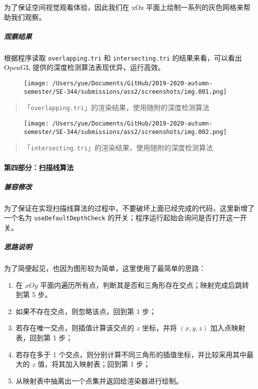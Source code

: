 \documentclass[
]{article}
\begin{document}
为了保证空间视觉观看体验，因此我们在 xOz
平面上绘制一系列的灰色网格来帮助我们观察。

\hypertarget{header-n167}{%
\subparagraph{观察结果}\label{header-n167}}

根据程序读取 \texttt{overlapping.tri} 和 \texttt{intersecting.tri}
的结果来看，可以看出 OpenGL 提供的深度检测算法表现优异，运行高效。

\begin{figure}
\centering
\texttt{[image: /Users/yue/Documents/GitHub/2019-2020-autumn-semester/SE-344/submissions/ass2/screenshots/img.001.png]}
\caption{}
\end{figure}

\begin{quote}
「\texttt{overlapping.tri}」的渲染结果，使用随附的深度检测算法
\end{quote}

\begin{figure}
\centering
\texttt{[image: /Users/yue/Documents/GitHub/2019-2020-autumn-semester/SE-344/submissions/ass2/screenshots/img.002.png]}
\caption{}
\end{figure}

\begin{quote}
「\texttt{intersecting.tri}」的渲染结果，使用随附的深度检测算法
\end{quote}

\hypertarget{header-n187}{%
\paragraph{第四部分：扫描线算法}\label{header-n187}}

\hypertarget{header-n194}{%
\subparagraph{兼容修改}\label{header-n194}}

为了保证在实现扫描线算法的过程中，不要破坏上面已经完成的代码，这里新增了一个名为
\texttt{useDefaultDepthCheck}
的开关；程序运行起始会询问是否打开这一开关。

\hypertarget{header-n192}{%
\subparagraph{思路说明}\label{header-n192}}

为了简便起见，也因为图形较为简单，这里使用了最简单的思路：

\begin{enumerate}
\def\labelenumi{\arabic{enumi}.}
\item
  在 \(xOy\)
  平面内遍历所有点，判断其是否和三角形存在交点；映射完成后跳转到第 5
  步。
\item
  如果不存在交点，则忽略该点，回到第 1 步；
\item
  若存在唯一交点，则插值计算该交点的 \(z\) 坐标，并将 \((x, y, z)\)
  加入点映射表，回到第 1 步；
\item
  若存在多于 1
  个交点，则分别计算不同三角形的插值坐标，并比较采用其中最大的 \(z\)
  值，将其加入映射表；回到第 1 步；
\item
  从映射表中抽离出一个点集并返回给渲染器进行绘制。
\end{enumerate}
\end{document}
